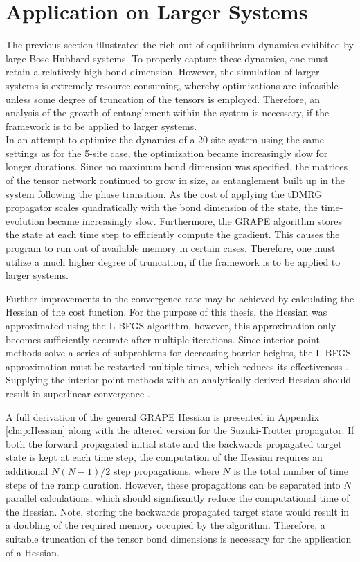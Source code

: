 \section{Application on Larger Systems} \label{sec:appLargeSystems}

The previous section illustrated the rich out-of-equilibrium dynamics exhibited by large Bose-Hubbard systems. To properly capture these dynamics, one must retain a relatively high bond dimension. However, the simulation of larger systems is extremely resource consuming, whereby optimizations are infeasible unless some degree of truncation of the tensors is employed. Therefore, an analysis of the growth of entanglement within the system is necessary, if the framework is to be applied to larger systems.\\

In an attempt to optimize the dynamics of a 20-site system using the same settings as for the 5-site case, the optimization became increasingly slow for longer durations. Since no maximum bond dimension was specified, the matrices of the tensor network continued to grow in size, as entanglement built up in the system following the phase transition. As the cost of applying the tDMRG propagator scales quadratically with the bond dimension of the state, the time-evolution became increasingly slow. Furthermore, the GRAPE algorithm stores the state at each time step to efficiently compute the gradient. This causes the program to run out of available memory in certain cases. Therefore, one must utilize a much higher degree of truncation, if the framework is to be applied to larger systems.

Further improvements to the convergence rate may be achieved by calculating the Hessian of the cost function. For the purpose of this thesis, the Hessian was approximated using the L-BFGS algorithm, however, this approximation only becomes sufficiently accurate after multiple iterations. Since interior point methods solve a series of subproblems for decreasing barrier heights, the L-BFGS approximation must be restarted multiple times, which reduces its effectiveness \cite{Wachter2006}. Supplying the interior point methods with an analytically derived Hessian should result in superlinear convergence \cite{wright}.

A full derivation of the general GRAPE Hessian is presented in Appendix \ref{chap:Hessian} along with the altered version for the Suzuki-Trotter propagator. If both the forward propagated initial state and the backwards propagated target state is kept at each time step, the computation of the Hessian requires an additional $N(N - 1)/2$ step propagations, where $N$ is the total number of time steps of the ramp duration. However, these propagations can be separated into $N$ parallel calculations, which should significantly reduce the computational time of the Hessian. Note, storing the backwards propagated target state would result in a doubling of the required memory occupied by the algorithm. Therefore, a suitable truncation of the tensor bond dimensions is necessary for the application of a Hessian.

